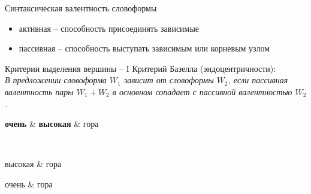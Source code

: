 \documentclass{beamer}
\begin{document}
\begin{frame}{Синтаксическая валентность словоформы}
\begin{itemize}
    \item активная -- способность присоединять зависимые
    \item пассивная -- способность выступать зависимым или корневым узлом
\end{itemize}
\end{frame}

\begin{frame}{Критерии выделения вершины -- I}
Критерий Базелла (эндоцентричности):\\
\medskip
{\small \textit{В предложении словоформа $W_1$ зависит от словоформы $W_2$, если пассивная валентность пары $W_1 + W_2$ в основном сопадает с пассивной валентностью $W_2$.}}

\begin{center}
\begin{dependency}[theme = simple]
   \begin{deptext}[column sep=1em]
      \textbf{очень} \& \textbf{высокая} \& гора \\
   \end{deptext}
\end{dependency}
\\
\begin{dependency}[theme = simple]
   \begin{deptext}[column sep=1em]
      высокая \& гора \\
   \end{deptext}
\end{dependency}
\begin{dependency}[theme = simple]
   \begin{deptext}[column sep=1em]
      очень \& гора \\
   \end{deptext}
\end{dependency}
\end{center}
\end{frame}
\end{document}
